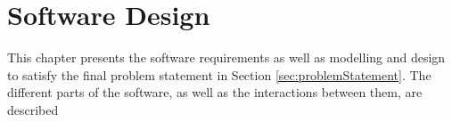 \chapter{Software Design}\label{ch:SoftwareDesign}

This chapter presents the software requirements as well as modelling and design to satisfy the final problem statement in Section \ref{sec:problemStatement}. The different parts of the software, as well as the interactions between them, are described


